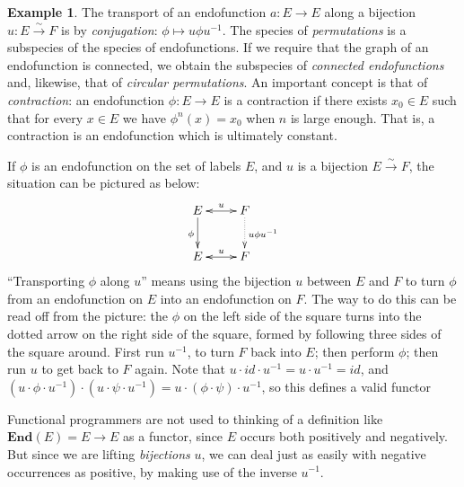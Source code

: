 \documentclass{amsart}
\theoremstyle{definition}
\newtheorem{ex}{Example}
\theoremstyle{remark}
\newcommand{\bij}{\stackrel{\sim}{\rightarrow}}
\newcommand{\id}{\mathit{id}}
\begin{document}
\begin{ex} \label{ex:endofunctions}
  The transport of an endofunction $a : E \to E$ along a bijection $u
  : E \bij F$ is by \emph{conjugation}: $\phi \mapsto u \phi
  u^{-1}$. The species of \emph{permutations} is a subspecies of the
  species of endofunctions. If we require that the graph of an
  endofunction is connected, we obtain the subspecies of
  \emph{connected endofunctions} and, likewise, that of \emph{circular
    permutations}. An important concept is that of \emph{contraction}:
  an endofunction $\phi : E \to E$ is a contraction if there exists
  $x_0 \in E$ such that for every $x \in E$ we have $\phi^n(x) = x_0$
  when $n$ is large enough. That is, a contraction is an endofunction
  which is ultimately constant.

  \begin{commentary}
    If $\phi$ is an endofunction on the set of labels $E$, and $u$ is
    a bijection $E \bij F$, the situation can be pictured as below:
    \[ \xymatrix{E
        \ar@{<->}[r]^{u} \ar[d]_{\phi} & F \ar@{.>}[d]^{u \phi u^{-1}} \\
        E \ar@{<->}[r]^{u} & F } \] ``Transporting $\phi$ along $u$''
    means using the bijection $u$ between $E$ and $F$ to turn $\phi$
    from an endofunction on $E$ into an endofunction on $F$.  The way
    to do this can be read off from the picture: the $\phi$ on the
    left side of the square turns into the dotted arrow on the right
    side of the square, formed by following three sides of the square
    around.  First run $u^{-1}$, to turn $F$ back into $E$; then
    perform $\phi$; then run $u$ to get back to $F$ again.  Note that
    $u \cdot \id \cdot u^{-1} = u \cdot u^{-1} = \id$, and $(u \cdot
    \phi \cdot u^{-1}) \cdot (u \cdot \psi \cdot u^{-1}) = u \cdot
    (\phi \cdot \psi) \cdot u^{-1}$, so this defines a valid functor

    Functional programmers are not used to thinking of a definition
    like $\mathbf{End}(E) = E \to E$ as a functor, since $E$ occurs
    both positively and negatively.  But since we are lifting
    \emph{bijections} $u$, we can deal just as easily with negative
    occurrences as positive, by making use of the inverse $u^{-1}$.

  \end{commentary}
\end{ex}
\end{document}
